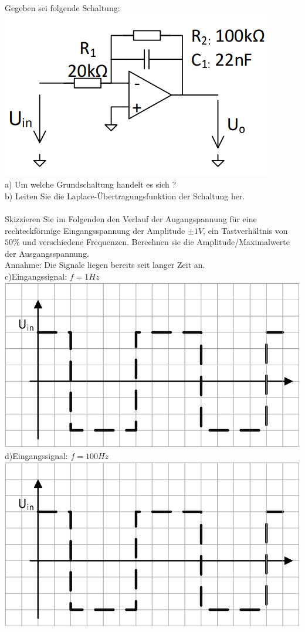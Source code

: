\documentclass[A4]{scrreprt}
\begin{document}
  Gegeben sei folgende Schaltung:\\
  \includegraphics{Schaltung6.png}\\
  a) Um welche Grundschaltung handelt es sich ?\\
  b) Leiten Sie die Laplace-Übertragungsfunktion der Schaltung her.\\\\
  Skizzieren Sie im Folgenden den Verlauf der Augangspannung für eine rechteckförmige Eingangsspannung der Amplitude $\pm 1V$, ein Tastverhältnis von $50\%$ und verschiedene Frequenzen.
  Berechnen sie die Amplitude/Maximalwerte der Ausgangsspannung.\\
  Annahme: Die Signale liegen bereits seit langer Zeit an.\\
  c)Eingangssignal: $f=1Hz$\\
  \includegraphics{U_rechteck.png}\\
  d)Eingangssignal: $f=100Hz$\\
  \includegraphics{U_rechteck.png}\\
\end{document}
